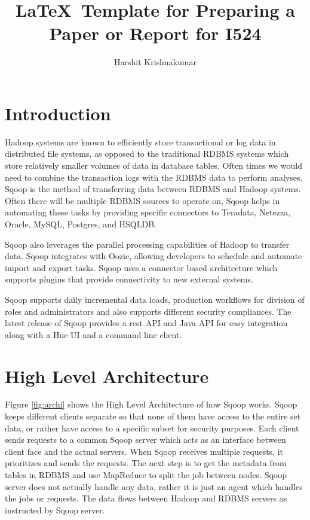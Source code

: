 \documentclass[9pt,twocolumn,twoside]{styles/osajnl}
\title{\LaTeX\ Template for Preparing a Paper or Report for I524}
\author[1,*]{Harshit Krishnakumar}
\affil[1]{School of Informatics and Computing, Bloomington, IN 47408, U.S.A.}
\affil[*]{Corresponding authors: harkrish@iu.edu, S17-IR-2014}
\begin{document}
\maketitle

\section{Introduction}

Hadoop systems are known to efficiently store transactional or log data in distributed file systems, as opposed to the traditional RDBMS systems which store relatively smaller volumes of data in database tables. Often times we would need to combine the transaction logs with the RDBMS data to perform analyses. Sqoop is the method of transferring data between RDBMS and Hadoop systems. Often there will be multiple RDBMS sources to operate on, Sqoop helps in automating these tasks by providing specific connectors to Teradata, Netezza, Oracle, MySQL, Postgres, and HSQLDB. 

Sqoop also leverages the parallel processing capabilities of Hadoop to transfer data. Sqoop integrates with Oozie, allowing developers to schedule and automate import and export tasks. Sqoop uses a connector based architecture which supports plugins that provide connectivity to new external systems.

Sqoop supports daily incremental data loads, production workflows for division of roles and administrators and also supports different security compliances. The latest release of Sqoop provides a rest API and Java API for easy integration along with a Hue UI and a command line client.\cite{cloudera}

\section{High Level Architecture}

Figure \ref{fig:archi} shows the High Level Architecture of how Sqoop works. Sqoop keeps different clients separate so that none of them have access to the entire set data, or rather have access to a specific subset for security purposes. Each client sends requests to a common Sqoop server which acts as an interface between client face and the actual servers. When Sqoop receives multiple requests, it prioritizes and sends the requests. The next step is to get the metadata from tables in RDBMS and use MapReduce to split the job between nodes. Sqoop server does not actually handle any data, rather it is just an agent which handles the jobs or requests. The data flows between Hadoop and RDBMS servers as instructed by Sqoop server\cite{sqoop-blog}.
\end{document}
